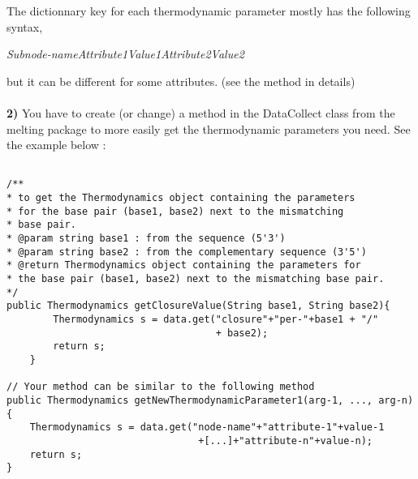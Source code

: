 \documentclass{article}
\begin{document}
The dictionnary key for each thermodynamic parameter mostly has the following syntax,

\textit{Subnode-nameAttribute1Value1Attribute2Value2}

 but it can be different for some attributes. (see the method in details)\\
\\
\textbf{2)} You have to create (or change) a method in the DataCollect class from the melting package
to more easily get the thermodynamic parameters you need. See the example below :

\begin{verbatim}

/**
* to get the Thermodynamics object containing the parameters 
* for the base pair (base1, base2) next to the mismatching 
* base pair.
* @param string base1 : from the sequence (5'3')
* @param string base2 : from the complementary sequence (3'5')
* @return Thermodynamics object containing the parameters for 
* the base pair (base1, base2) next to the mismatching base pair.
*/
public Thermodynamics getClosureValue(String base1, String base2){
		Thermodynamics s = data.get("closure"+"per-"+base1 + "/" 
		                            + base2);
		return s;
	}
	
// Your method can be similar to the following method
public Thermodynamics getNewThermodynamicParameter1(arg-1, ..., arg-n){
	Thermodynamics s = data.get("node-name"+"attribute-1"+value-1 
	                             +[...]+"attribute-n"+value-n);
	return s;
}

\end{verbatim}
\end{document}
